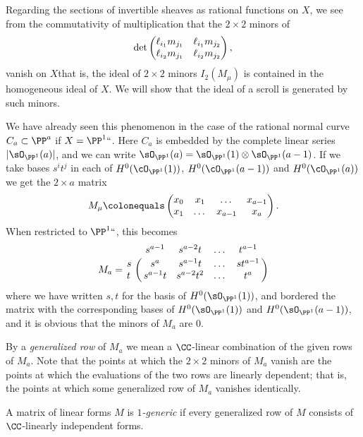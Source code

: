 Regarding the sections of invertible sheaves as rational functions on $X$,
we see from the commutativity of
multiplication that the $2\times 2$ minors
of
\vspace*{3pt}
$$
\vspace*{3pt}
\det \begin{pmatrix}
\ell_{i_1}m_{j_1} & \ell_{i_1}m_{j_2}\\
\ell_{i_2}m_{j_1} &\ell_{i_2}m_{j_2}
\end{pmatrix},
$$
vanish on $X$\emdash that is, the ideal of $2\times 2$ minors $I_2(M_\mu)$
is contained in the homogeneous ideal
of $X$. We will show that the ideal of a scroll is
generated by such minors.

\begin{example}
We have already seen this phenomenon in the case of the rational normal
curve $C_a\subset \PP^a$ if $X = \PP^1` `$.
Here $C_{a}$ is embedded by the complete
linear series $|\sO_{\PP^1}(a)|$, and  we can write $\sO_{\PP^1}(a) =
\sO_{\PP^1}(1)\otimes \sO_{\PP^1}(a-1)$.
If we take bases $s^it^j$ in each of $H^0(\cO_{\PP^1}(1))$,
$H^0(\cO_{\PP^1}(a-1))$ and $H^0(\cO_{\PP^1}(a))$
we get
the $2\times a$ matrix
$$
M_\mu \colonequals
\begin{pmatrix}
x_0&x_1&\dots&x_{a-1}\\
x_1&\dots&x_{a-1}&x_a
\end{pmatrix}.
$$
When restricted to $\PP^1` `$, this becomes
$$
M_a = \bordermatrix{
& s^{a-1}&s^{a-2}t&\dots&t^{a-1}\cr
s&  s^{a}& s^{a-1}t&\dots&st^{a-1}\cr
t&  s^{a-1}t& s^{a-2}t^{2}&\dots&t^{a}\cr
}$$
where we have written $s,t$ for the basis of $H^0(\sO_{\PP^1}(1))$,
and bordered the matrix
with the corresponding bases of $H^0(\sO_{\PP^1}(1))$ and
$H^0(\sO_{\PP^1}(a-1))$, and it is obvious
that the minors of $M_a$ are 0.
\end{example}

By a \emph{generalized row} of $M_{a}$ we mean a $\CC$-linear combination
%
of the given rows of $M_{a}$. Note that the points at which the $2\times2$ 
minors of $M_{a}$ vanish are the points at which the evaluations of
the two rows are linearly dependent; that is, the points at which some
generalized row of $M_{a}$ vanishes identically.

\begin{definition}
A matrix of linear forms $M$ is  \emph{$1$-generic} if every generalized
row of $M$
consists of $\CC$-linearly independent forms.
%
\end{definition}

